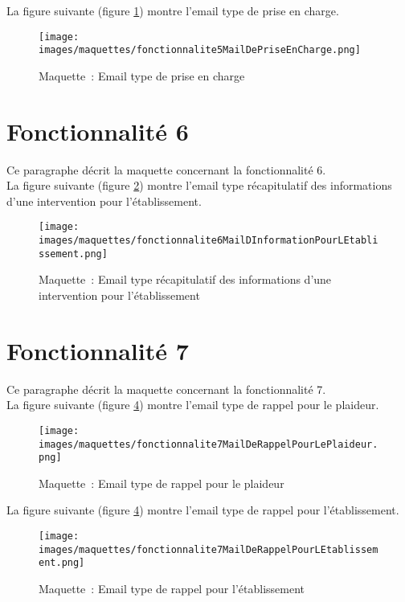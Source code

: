 La figure suivante (figure \ref{maquette5-2}) montre l'email type de prise en charge. \\
\begin{figure}[H]
	\centering
	\texttt{[image: images/maquettes/fonctionnalite5MailDePriseEnCharge.png]}
	\caption{Maquette~: Email type de prise en charge}
	\label{maquette5-2}
\end{figure}


\section{Fonctionnalité 6}
Ce paragraphe décrit la maquette concernant la fonctionnalité 6. \\

La figure suivante (figure \ref{maquette6}) montre l'email type récapitulatif des informations d'une intervention pour l'établissement.
\begin{figure}[H]
	\centering
	\texttt{[image: images/maquettes/fonctionnalite6MailDInformationPourLEtablissement.png]}
	\caption{Maquette~: Email type récapitulatif des informations d'une intervention pour l'établissement}
	\label{maquette6}
\end{figure}




\section{Fonctionnalité 7}
Ce paragraphe décrit la maquette concernant la fonctionnalité 7.\\

La figure suivante (figure \ref{maquette7}) montre l'email type de rappel pour le plaideur.
\begin{figure}[H]
	\centering
	\texttt{[image: images/maquettes/fonctionnalite7MailDeRappelPourLePlaideur.png]}
	\caption{Maquette~: Email type de rappel pour le plaideur}
	\label{maquette7}
\end{figure}

La figure suivante (figure \ref{maquette7}) montre l'email type de rappel pour l'établissement.
\begin{figure}[H]
	\centering
	\texttt{[image: images/maquettes/fonctionnalite7MailDeRappelPourLEtablissement.png]}
	\caption{Maquette~: Email type de rappel pour l'établissement}
	\label{maquette7}
\end{figure}
